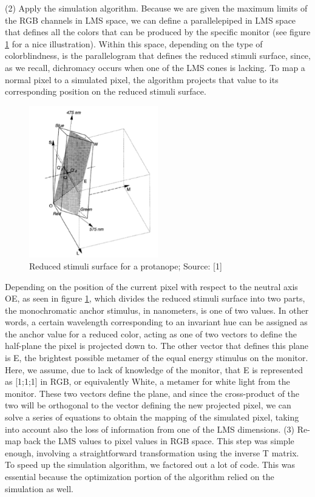 \documentclass[10pt,twocolumn,letterpaper]{article}
\begin{document}
(2) 	Apply the simulation algorithm. Because we are given the maximum limits of the RGB channels in LMS space, we can define a parallelepiped in LMS space that defines all the colors that can be produced by the specific monitor (see figure \ref{fig:para} for a nice illustration).  Within this space, depending on the type of colorblindness, is the parallelogram that defines the reduced stimuli surface, since, as we recall, dichromacy occurs when one of the LMS cones is lacking. To map a normal pixel to a simulated pixel, the algorithm projects that value to its corresponding position on the reduced stimuli surface. 

\begin{figure}[h]
  \includegraphics[width=0.5\textwidth]{para.png}
  \caption{Reduced stimuli surface for a protanope; Source: [1]}
  \label{fig:para}
\end{figure}

Depending on the position of the current pixel with respect to the neutral axis OE, as seen in figure \ref{fig:para}, which divides the reduced stimuli surface into two parts, the monochromatic anchor stimulus, in nanometers, is one of two values. In other words, a certain wavelength corresponding to an invariant hue can be assigned as the anchor value for a reduced color, acting as one of two vectors to define the half-plane the pixel is projected down to. The other vector that defines this plane is E, the brightest possible metamer of the equal energy stimulus on the monitor. Here, we assume, due to lack of knowledge of the monitor, that E is represented as [1;1;1] in RGB, or equivalently White, a metamer for white light from the monitor. These two vectors define the plane, and since the cross-product of the two will be orthogonal to the vector defining the new projected pixel, we can solve a series of equations to obtain the mapping of the simulated pixel, taking into account also the loss of information from one of the LMS dimensions. 
(3) 	Re-map back the LMS values to pixel values in RGB space.  This step was simple enough, involving a straightforward transformation using the inverse T matrix. To speed up the simulation algorithm, we factored out a lot of code. This was essential because the optimization portion of the algorithm relied on the simulation as well. 
\end{document}
